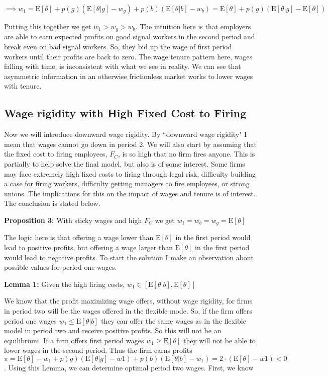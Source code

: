\documentclass[11pt]{article}
\newcommand{\E}{\mathrm{E}}
\begin{document}
$$ \implies w_1 = \E[\theta] + p(g)(\E[\theta|g] - w_g) + p(b)(\E[\theta | b] - w_b) 
 = \E[\theta] + p(g)(\E[\theta | g] - \E[\theta]) $$
 
 Putting this together we get $w_1 > w_g > w_b$. The intuition here is that employers are able to earn expected profits on good signal workers in the second period and break even on bad signal workers. So, they bid up the wage of first period workers until their profits are back to zero. The wage tenure pattern here, wages falling with time, is inconsistent with what we see in reality. We can see that asymmetric information in an otherwise frictionless market works to lower wages with tenure.
 
 \subsection{Wage rigidity with High Fixed Cost to Firing }
 
 Now we will introduce downward wage rigidity. By ``downward wage rigidity" I mean that wages cannot go down in period 2. We will also start by assuming that the fixed cost to firing employees, $F_C$, is so high that no firm fires anyone. This is partially to help solve the final model, but also is of some interest. Some firms may face extremely high fixed costs to firing through legal risk, difficulty building a case for firing workers, difficulty getting managers to fire employees, or strong unions. The implications for this on the impact of wages and tenure is of interest. The conclusion is stated below. 
 
 \textbf{Proposition 3:} With sticky wages and high $F_C$ we get  $w_1 = w_b = w_g =\E[\theta]$
 
 The logic here is that offering a wage lower than $\E[\theta]$ in the first period would lead to positive profits, but offering a wage larger than $\E[\theta]$ in the first period would lead to negative profits. To start the solution I make an observation about possible values for period one wages. 
 
 \textbf{Lemma 1:} Given the high firing costs, $w_1 \in \left[\E[\theta|b], \E[\theta] \right]$ 
 
 We know that the profit maximizing wage offers, without wage rigidity, for firms in period 
two will be the wages offered in the flexible mode. So, if the firm offers period one wages 
$w_1 \leq \E[\theta | b]$ they can offer the same wages as in the flexible model in period two 
and receive positive profits. So this will not be an equilibrium. If a firm offers first 
period wages $w_1 \geq \E[\theta]$ they will not be able to lower wages in the second period. Thus the firm earns profits $\pi = \E[\theta] - w_1 + p(g)(\E[\theta|g] - w1) + p(b)(\E[\theta|b] - w_1) = 2\cdot(\E[\theta] - w1) < 0 $. Using this Lemma, we can determine optimal period two wages. First, we know 
\end{document}
